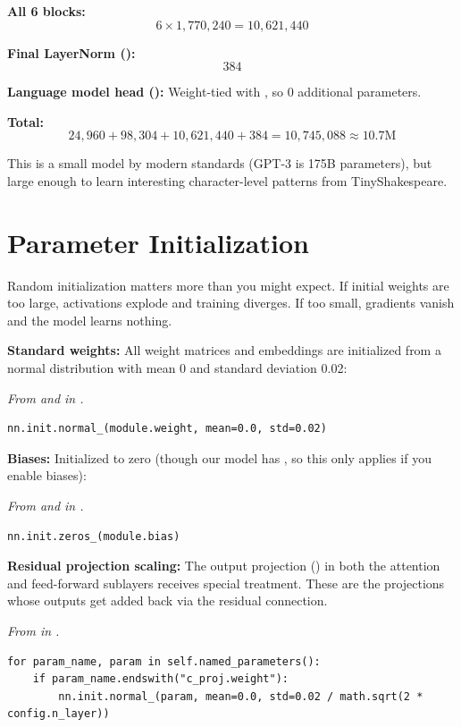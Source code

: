 \textbf{All 6 blocks:}
\[6 \times 1{,}770{,}240 = 10{,}621{,}440\]

\textbf{Final LayerNorm ():}
\[384\]

\textbf{Language model head ():}
Weight-tied with , so 0 additional parameters.

\textbf{Total:}
\[24{,}960 + 98{,}304 + 10{,}621{,}440 + 384 = 10{,}745{,}088 \approx 10.7\text{M}\]

This is a small model by modern standards (GPT-3 is 175B parameters), but large enough to learn interesting character-level patterns from TinyShakespeare.

\section{Parameter Initialization}

Random initialization matters more than you might expect. If initial weights are too large, activations explode and training diverges. If too small, gradients vanish and the model learns nothing.

\textbf{Standard weights:} All weight matrices and embeddings are initialized from a normal distribution with mean 0 and standard deviation 0.02:

\concepttag
{\small\itshape From  and  in .}
\begin{lstlisting}
nn.init.normal_(module.weight, mean=0.0, std=0.02)
\end{lstlisting}

\textbf{Biases:} Initialized to zero (though our model has , so this only applies if you enable biases):

\concepttag
{\small\itshape From  and  in .}
\begin{lstlisting}
nn.init.zeros_(module.bias)
\end{lstlisting}

\textbf{Residual projection scaling:} The output projection () in both the attention and feed-forward sublayers receives special treatment. These are the projections whose outputs get added back via the residual connection.

\concepttag
{\small\itshape From  in .}
\begin{lstlisting}
for param_name, param in self.named_parameters():
    if param_name.endswith("c_proj.weight"):
        nn.init.normal_(param, mean=0.0, std=0.02 / math.sqrt(2 * config.n_layer))
\end{lstlisting}

